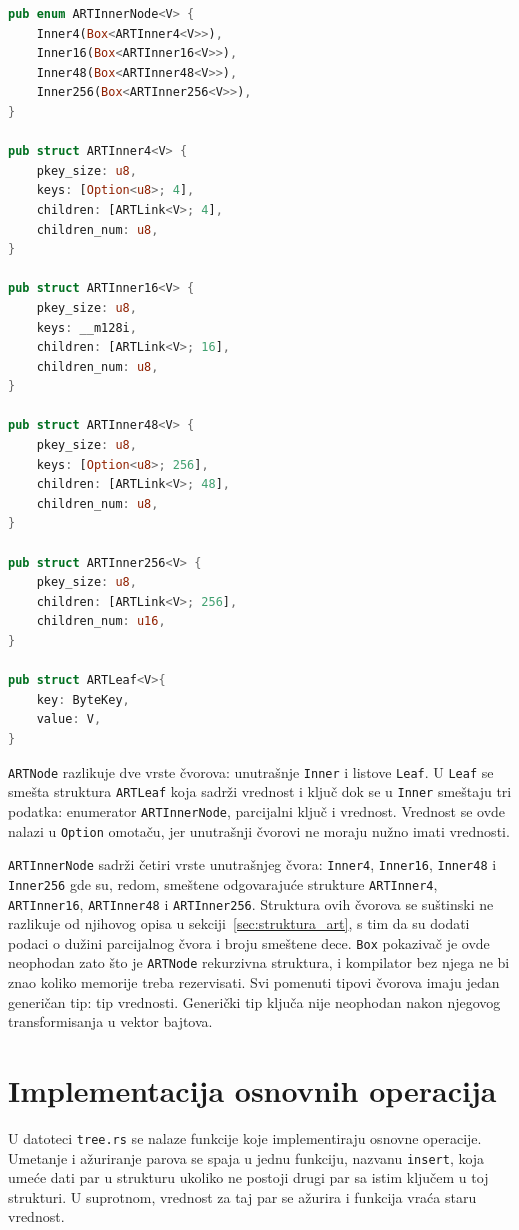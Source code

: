 \documentclass[12pt,oneside]{memoir}
\begin{document}
\begin{lstlisting}[language=Rust,
                   caption={Definicije čvorova
                            koji se nalaze u strukturi \texttt{ARTree}},
                   label={kod:artnode}]
pub enum ARTInnerNode<V> {
    Inner4(Box<ARTInner4<V>>),
    Inner16(Box<ARTInner16<V>>),
    Inner48(Box<ARTInner48<V>>),
    Inner256(Box<ARTInner256<V>>),
}

pub struct ARTInner4<V> {
    pkey_size: u8,
    keys: [Option<u8>; 4],
    children: [ARTLink<V>; 4],
    children_num: u8,
}

pub struct ARTInner16<V> {
    pkey_size: u8,
    keys: __m128i,
    children: [ARTLink<V>; 16],
    children_num: u8,
}

pub struct ARTInner48<V> {
    pkey_size: u8,
    keys: [Option<u8>; 256],
    children: [ARTLink<V>; 48],
    children_num: u8,
}

pub struct ARTInner256<V> {
    pkey_size: u8,
    children: [ARTLink<V>; 256],
    children_num: u16,
}

pub struct ARTLeaf<V>{
    key: ByteKey,
    value: V,
}
\end{lstlisting}

\texttt{ARTNode} razlikuje dve vrste čvorova: unutrašnje \texttt{Inner} i
listove \texttt{Leaf}. U \texttt{Leaf} se smešta struktura \texttt{ARTLeaf}
koja sadrži vrednost i ključ dok se u \texttt{Inner} smeštaju tri podatka:
enumerator \texttt{ARTInnerNode}, parcijalni ključ i vrednost. Vrednost se ovde
nalazi u \texttt{Option} omotaču, jer unutrašnji čvorovi
ne moraju nužno imati vrednosti.

\texttt{ARTInnerNode} sadrži četiri vrste unutrašnjeg čvora:
\texttt{Inner4}, \texttt{Inner16}, \texttt{Inner48} i
\texttt{Inner256} gde su, redom, smeštene odgovarajuće strukture
\texttt{ARTInner4}, \texttt{ARTInner16}, \texttt{ARTInner48} i
\texttt{ARTInner256}. Struktura ovih čvorova se suštinski ne razlikuje od
njihovog opisa u sekciji~\ref{sec:struktura_art}, s tim da su dodati
podaci o dužini parcijalnog čvora i broju smeštene dece.
\texttt{Box} pokazivač je ovde neophodan zato što je \texttt{ARTNode}
rekurzivna struktura, i kompilator bez njega ne bi znao
koliko memorije treba rezervisati.
Svi pomenuti tipovi čvorova imaju jedan generičan
tip: tip vrednosti. Generički tip ključa nije neophodan nakon njegovog
transformisanja u vektor bajtova.

\section{Implementacija osnovnih operacija}
U datoteci \texttt{tree.rs} se nalaze funkcije koje implementiraju
osnovne operacije.
Umetanje i ažuriranje parova se spaja u jednu funkciju,
nazvanu \texttt{insert}, koja umeće dati par
u strukturu ukoliko ne postoji drugi par sa istim ključem u toj strukturi.
U suprotnom, vrednost za taj par se ažurira i funkcija vraća staru vrednost.
\end{document}

